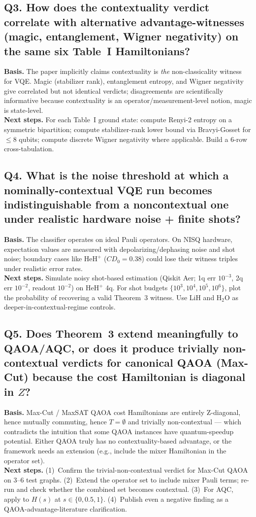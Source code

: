 \subsection*{Q3. How does the contextuality verdict correlate with alternative advantage-witnesses (magic, entanglement, Wigner negativity) on the same six Table~I Hamiltonians?}
\textbf{Basis.} The paper implicitly claims contextuality is \emph{the}
non-classicality witness for VQE. Magic (stabilizer rank), entanglement
entropy, and Wigner negativity give correlated but not identical verdicts;
disagreements are scientifically informative because contextuality is an
operator/measurement-level notion, magic is state-level.\\
\textbf{Next steps.} For each Table~I ground state: compute Renyi-2 entropy
on a symmetric bipartition; compute stabilizer-rank lower bound via
Bravyi-Gosset for $\le 8$ qubits; compute discrete Wigner negativity where
applicable. Build a $6$-row cross-tabulation.

\subsection*{Q4. What is the noise threshold at which a nominally-contextual VQE run becomes indistinguishable from a noncontextual one under realistic hardware noise + finite shots?}
\textbf{Basis.} The classifier operates on ideal Pauli operators. On NISQ
hardware, expectation values are measured with depolarizing/dephasing noise
and shot noise; boundary cases like $\mathrm{HeH}^+$ ($CD_0{=}0.38$) could
lose their witness triples under realistic error rates.\\
\textbf{Next steps.} Simulate noisy shot-based estimation (Qiskit Aer;
1q err $10^{-3}$, 2q err $10^{-2}$, readout $10^{-2}$) on
$\mathrm{HeH}^+$ 4q. For shot budgets $\{10^3, 10^4, 10^5, 10^6\}$, plot the
probability of recovering a valid Theorem~3 witness. Use LiH and
$\mathrm{H}_2\mathrm{O}$ as deeper-in-contextual-regime controls.

\subsection*{Q5. Does Theorem~3 extend meaningfully to QAOA/AQC, or does it produce trivially non-contextual verdicts for canonical QAOA (Max-Cut) because the cost Hamiltonian is diagonal in $Z$?}
\textbf{Basis.} Max-Cut / MaxSAT QAOA cost Hamiltonians are entirely
Z-diagonal, hence mutually commuting, hence $T = \emptyset$ and trivially
non-contextual --- which contradicts the intuition that some QAOA instances
have quantum-speedup potential. Either QAOA truly has no contextuality-based
advantage, or the framework needs an extension (e.g., include the mixer
Hamiltonian in the operator set).\\
\textbf{Next steps.} (1)~Confirm the trivial-non-contextual verdict for
Max-Cut QAOA on 3--6 test graphs. (2)~Extend the operator set to include
mixer Pauli terms; re-run and check whether the combined set becomes
contextual. (3)~For AQC, apply to $H(s)$ at $s\in\{0, 0.5, 1\}$. (4)~Publish
even a negative finding as a QAOA-advantage-literature clarification.
